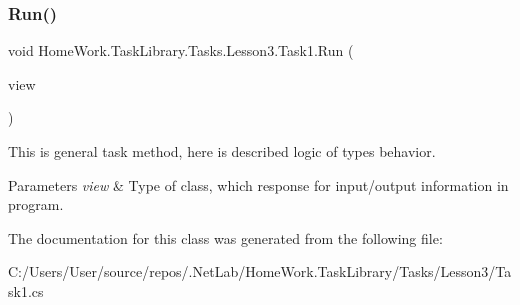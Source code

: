 \subsubsection{\texorpdfstring{Run()}{Run()}}
{\footnotesize\ttfamily void Home\+Work.\+Task\+Library.\+Tasks.\+Lesson3.\+Task1.\+Run (\begin{DoxyParamCaption}\item[{I\+Information}]{view }\end{DoxyParamCaption})}



This is general task method, here is described logic of types behavior. 


\begin{DoxyParams}{Parameters}
{\em view} & Type of class, which response for input/output information in program.\\
\hline
\end{DoxyParams}


The documentation for this class was generated from the following file\+:\begin{DoxyCompactItemize}
\item 
C\+:/\+Users/\+User/source/repos/.\+Net\+Lab/\+Home\+Work.\+Task\+Library/\+Tasks/\+Lesson3/Task1.\+cs\end{DoxyCompactItemize}
